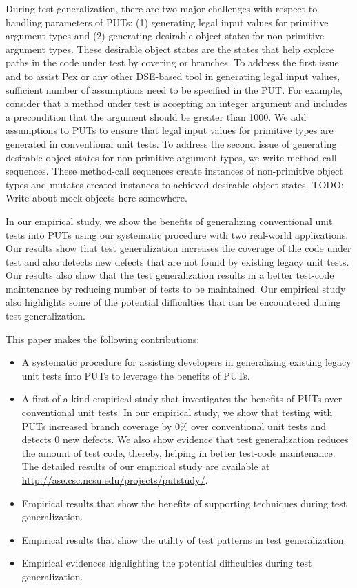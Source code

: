 During test generalization, there are two major challenges with respect to handling parameters of PUTs: (1) generating legal input values for primitive argument types and (2) generating desirable object states for non-primitive argument types. These desirable object states are the states that help explore paths in the code under test by covering  or  branches. To address the first issue and to assist Pex or any other DSE-based tool in generating legal input values,  sufficient number of assumptions need to be specified in the PUT. For example, consider that a method under test is accepting an integer argument and includes a precondition that the argument should be greater than 1000. We add assumptions to PUTs to ensure that legal input values for primitive types are generated in conventional unit tests. To address the second issue of generating desirable object states for non-primitive argument types, we write method-call sequences. These method-call sequences create instances of non-primitive object types and mutates created instances to achieved desirable object states. TODO: Write about mock objects here somewhere.

In our empirical study, we show the benefits of generalizing conventional unit tests into PUTs using our systematic procedure with two real-world applications. Our results show that test generalization increases the coverage of the code under test and also detects new defects that are not found by existing legacy unit tests. Our results also show that the test generalization results in a better test-code maintenance by reducing number of tests to be maintained. Our empirical study also highlights some of the potential difficulties that can be encountered during test generalization.

This paper makes the following contributions:

\begin{itemize}
	\item A systematic procedure for assisting developers in generalizing existing legacy unit tests into PUTs to leverage the benefits of PUTs.
	\item A first-of-a-kind empirical study that investigates the benefits of PUTs over conventional unit tests. In our empirical study, we show that testing with PUTs increased branch coverage by $0$\% over conventional unit tests and detects $0$ new defects. We also show evidence that test generalization reduces the amount of test code, thereby, helping in better test-code maintenance. The detailed results of our empirical study are available at \url{http://ase.csc.ncsu.edu/projects/putstudy/}.	
	\item Empirical results that show the benefits of supporting techniques during test generalization. 
	\item Empirical results that show the utility of test patterns in test generalization.
	\item Empirical evidences highlighting the potential difficulties during test generalization.
\end{itemize}

